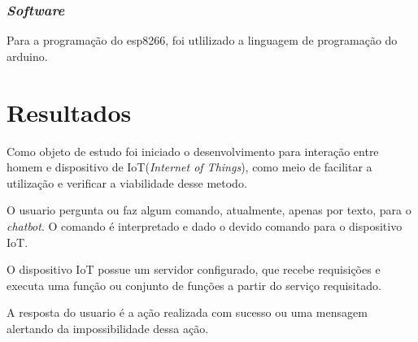 \documentclass[10pt,a4paper,twocolumn]{article}
\begin{document}
\subsubsection{\textit{Software}}
Para a programação do esp8266, foi utlilizado a linguagem de programação do arduino.

\section{\bf Resultados}
Como objeto de estudo foi iniciado o desenvolvimento para interação entre homem e dispositivo de IoT(\textit{Internet of Things}), como meio de facilitar a utilização e verificar a viabilidade desse metodo.


O usuario pergunta ou faz algum comando, atualmente, apenas por texto, para o \textit{chatbot}. O comando é interpretado e dado o devido comando para o dispositivo IoT.


O dispositivo IoT possue um servidor configurado, que recebe requisições e executa uma função ou conjunto de funções a partir do serviço requisitado.


A resposta do usuario é a ação realizada com sucesso ou uma mensagem alertando da impossibilidade dessa ação.
\end{document}
